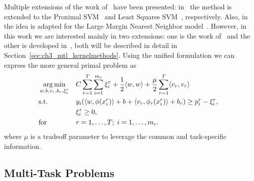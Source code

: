 Multiple extensions of the work of~\cite{EvgeniouP04} have been presented: in~\cite{XuAQZ14, LiTST15} the method is extended to the Proximal SVM~\cite{FungM01} and Least Squares SVM~\cite{SuykensV99}, respectively. Also, in~\cite{ParameswaranW10} the idea is adapted for the Large Margin Nearest Neighbor model~\cite{WeinbergerS09}.
%
However, in this work we are interested mainly in two extensions: one is the work of~\cite{EvgeniouMP05} and the other is developed in~\cite{LiangC08, CaiC09}, both will be described in detail in Section~\ref{sec:ch3_mtl_kernelmethods}.
Using the unified formulation we can express the more general primal problem as
\begin{equation}
    \nonumber
    \begin{aligned}
        & \operatorname*{arg\min}_{w, b, v_r, b_r, \xi_i^r}
        & & C \sum_{r=1}^T \sum_{i=1}^{m_r} \xi_i^r + \frac{1}{2} \langle w, w \rangle + \frac{\mu}{2} \sum_{r=1}^T \langle v_r, v_r \rangle \\
        & \text{s.t.}
        & & y_{i} ( \langle w, \phi(x_{i}^r) \rangle + b + \langle v_r, \phi_r(x_{i}^r) \rangle + b_r) \geq p_i^r - \xi_i^r ,\\
        & & &\xi_i^r \geq 0, \\
        & \text{for } & & r=1, \ldots, T; \; i=1, \ldots, m_r.
    \end{aligned}
\end{equation}
where $\mu$ is a tradeoff parameter to leverage the common and task-specific information.



\subsection{Multi-Task Problems}

